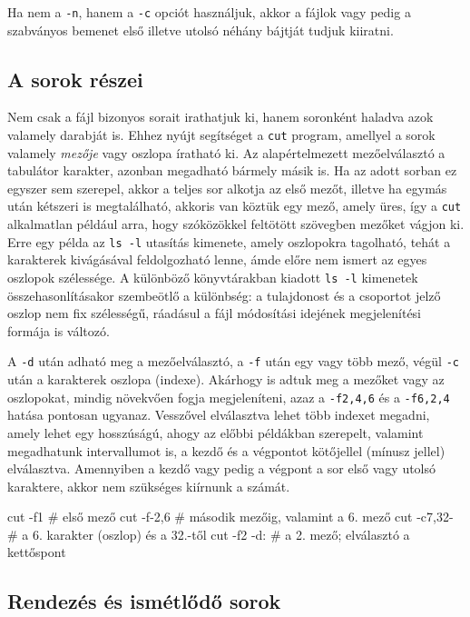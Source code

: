 Ha nem a \texttt{-n}, hanem a \texttt{-c} opciót használjuk, akkor a fájlok vagy
pedig a szabványos bemenet első illetve utolsó néhány bájtját tudjuk kiiratni.

\subsection{A sorok részei}

Nem csak a fájl bizonyos sorait irathatjuk ki, hanem soronként haladva azok
valamely darabját is. Ehhez nyújt segítséget a \texttt{cut} program, amellyel a
sorok valamely \emph{mezője} vagy oszlopa íratható ki. Az alapértelmezett
mezőelválasztó a tabulátor karakter, azonban megadható bármely másik
is. Ha az adott sorban ez egyszer sem szerepel, akkor a teljes sor alkotja az
első mezőt, illetve ha egymás után kétszeri is megtalálható, akkoris van köztük
egy mező, amely üres, így a \texttt{cut} alkalmatlan például arra, hogy
szóközökkel feltötött szövegben mezőket vágjon ki. Erre egy példa az \texttt{ls
  -l} utasítás kimenete, amely oszlopokra tagolható, tehát a karakterek
kivágásával feldolgozható lenne, ámde előre nem ismert az egyes oszlopok
szélessége. A különböző könyvtárakban kiadott \texttt{ls -l} kimenetek
összehasonlításakor szembeötlő a különbség: a tulajdonost és a csoportot jelző
oszlop nem fix szélességű, ráadásul a fájl módosítási idejének megjelenítési
formája is változó.

A \texttt{-d} után adható meg a mezőelválasztó, a \texttt{-f} után egy vagy több
mező, végül \texttt{-c} után a karakterek oszlopa (indexe). Akárhogy is adtuk
meg a mezőket vagy az oszlopokat, mindig növekvően fogja megjeleníteni, azaz a
\texttt{-f2,4,6} és a \texttt{-f6,2,4} hatása pontosan ugyanaz. Vesszővel
elválasztva lehet több indexet megadni, amely lehet egy hosszúságú, ahogy az
előbbi példákban szerepelt, valamint megadhatunk intervallumot is, a kezdő és a
végpontot kötőjellel (mínusz jellel) elválasztva. Amennyiben a kezdő vagy pedig
a végpont a sor első vagy utolsó karaktere, akkor nem szükséges kiírnunk a
számát.

\begin{VerbExample}
cut -f1        # első mező
cut -f-2,6     # második mezőig, valamint a 6. mező
cut -c7,32-    # a 6. karakter (oszlop) és a 32.-től
cut -f2 -d:    # a 2. mező; elválasztó a kettőspont
\end{VerbExample}



\subsection{Rendezés és ismétlődő sorok}


